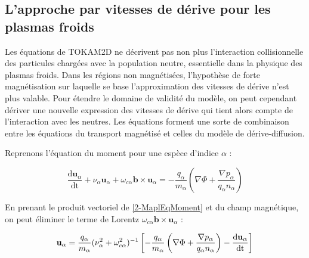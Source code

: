 \begin{refsection}
\section{L'approche par vitesses de dérive pour les plasmas
froids}
\label{vitessesDerivePlasmaFroid}
Les équations de TOKAM2D ne décrivent
pas non plus l'interaction collisionnelle des particules chargées avec la
population neutre, essentielle dans la physique des plasmas froids. Dans les
régions non magnétisées, l'hypothèse de forte magnétisation sur laquelle se
base l'approximation des vitesses de dérive n'est plus valable. Pour étendre le
domaine de validité du modèle, on peut cependant dériver une nouvelle
expression des vitesses de dérive qui tient alors compte de l'interaction
avec les neutres. Les équations forment une sorte de combinaison entre les
équations du transport magnétisé et celles du modèle de dérive-diffusion.

Reprenons l'équation du moment pour une espèce d'indice $\alpha$ :

\begin{equation}
\label{2-MaplEqMoment}
\frac{\text{d}\mathbf{u}_\alpha}{\text{dt}}+
\nu_\alpha\mathbf{u}_\alpha+\omega_{c\alpha}\mathbf{b}\times\mathbf{u}_\alpha=
-\frac{q_\alpha}{m_\alpha}\left(\nabla \Phi +\frac{\nabla p_\alpha}{q_\alpha n_\alpha}\right)
\end{equation}

En prenant le produit vectoriel de \eqref{2-MaplEqMoment} et du champ
magnétique,  on peut éliminer le terme de
Lorentz $\omega_{c\alpha}\mathbf{b}\times\mathbf{u}_\alpha$ :

\begin{equation}
\label{2-MaplVitesse}
\mathbf{u}_\alpha=\frac{q_\alpha}{m_\alpha}(\nu_\alpha^{{2}}+\omega_{c\alpha}^{{2}})^{{-1}}
\left[-\frac{q_\alpha}{m_\alpha}\left(\nabla \Phi +\frac{\nabla
p_\alpha}{q_\alpha
n_\alpha}\right)-\frac{\text{d}\mathbf{u}_\alpha}{\text{dt}}\right]
\end{equation}


\end{refsection}
